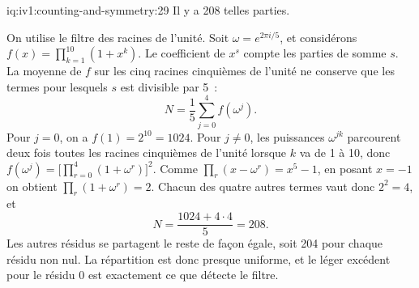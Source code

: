 \begin{solution}{iq:iv1:counting-and-symmetry:29}
Il y a 208 telles parties.

On utilise le filtre des racines de l'unité. Soit $\omega = e^{2\pi i/5}$, et considérons $f(x) = \prod_{k=1}^{10}(1 + x^k)$. Le coefficient de $x^s$ compte les parties de somme $s$. La moyenne de $f$ sur les cinq racines cinquièmes de l'unité ne conserve que les termes pour lesquels $s$ est divisible par 5~:
\[
N = \frac15 \sum_{j=0}^{4} f(\omega^j).
\]
Pour $j = 0$, on a $f(1) = 2^{10} = 1024$. Pour $j \ne 0$, les puissances $\omega^{jk}$ parcourent deux fois toutes les racines cinquièmes de l'unité lorsque $k$ va de 1 à 10, donc $f(\omega^j) = \bigl[\prod_{r=0}^{4}(1 + \omega^r)\bigr]^2$. Comme $\prod_r (x - \omega^r) = x^5 - 1$, en posant $x = -1$ on obtient $\prod_r (1 + \omega^r) = 2$. Chacun des quatre autres termes vaut donc $2^2 = 4$, et
\[
N = \frac{1024 + 4 \cdot 4}{5} = 208.
\]
Les autres résidus se partagent le reste de façon égale, soit 204 pour chaque résidu non nul. La répartition est donc presque uniforme, et le léger excédent pour le résidu 0 est exactement ce que détecte le filtre.

\end{solution}

